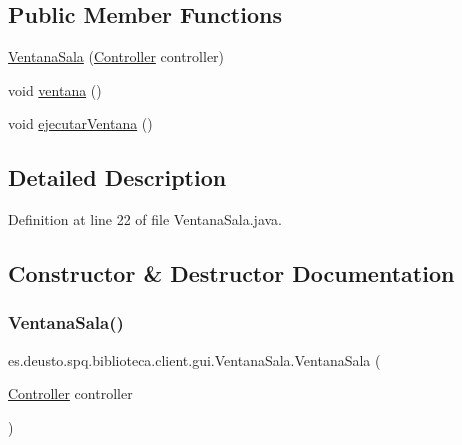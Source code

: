 \subsection*{Public Member Functions}
\begin{DoxyCompactItemize}
\item 
\mbox{\hyperlink{classes_1_1deusto_1_1spq_1_1biblioteca_1_1client_1_1gui_1_1_ventana_sala_a2e6af4bf083878d6e378cb7280a7f80b}{Ventana\+Sala}} (\mbox{\hyperlink{classes_1_1deusto_1_1spq_1_1biblioteca_1_1controller_1_1_controller}{Controller}} controller)
\item 
void \mbox{\hyperlink{classes_1_1deusto_1_1spq_1_1biblioteca_1_1client_1_1gui_1_1_ventana_sala_adeb222b4e7905f68619c913a62814a8e}{ventana}} ()
\item 
void \mbox{\hyperlink{classes_1_1deusto_1_1spq_1_1biblioteca_1_1client_1_1gui_1_1_ventana_sala_a651e8570ad62b5a769b2e45e51291694}{ejecutar\+Ventana}} ()
\end{DoxyCompactItemize}


\subsection{Detailed Description}


Definition at line 22 of file Ventana\+Sala.\+java.



\subsection{Constructor \& Destructor Documentation}
\mbox{\label{classes_1_1deusto_1_1spq_1_1biblioteca_1_1client_1_1gui_1_1_ventana_sala_a2e6af4bf083878d6e378cb7280a7f80b}} 
\subsubsection{\texorpdfstring{Ventana\+Sala()}{VentanaSala()}}
{\footnotesize\ttfamily es.\+deusto.\+spq.\+biblioteca.\+client.\+gui.\+Ventana\+Sala.\+Ventana\+Sala (\begin{DoxyParamCaption}\item[{\mbox{\hyperlink{classes_1_1deusto_1_1spq_1_1biblioteca_1_1controller_1_1_controller}{Controller}}}]{controller }\end{DoxyParamCaption})}

